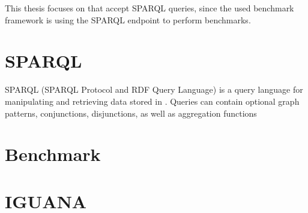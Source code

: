This thesis focuses on \tsp{} that accept SPARQL queries, since the used benchmark framework \iguana{} is using the SPARQL endpoint to perform benchmarks\cite{conradsIguanaGenericFramework2017}.


\section{SPARQL}
\label{sec:sparql}
SPARQL (SPARQL Protocol and RDF Query Language)\cite{harrisSPARQLQueryLanguage} is a query language for manipulating and retrieving data stored in \tsp{}.
Queries can contain optional graph patterns, conjunctions, disjunctions, as well as aggregation functions


\section{Benchmark}
\label{sec:benchmark}


\section{IGUANA}
\label{sec:iguana}
